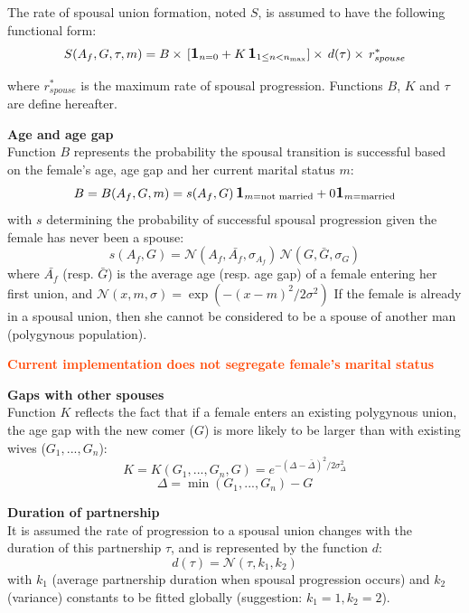 \documentclass[11pt, onecolumn]{article}
\newcommand{\one}[1]{\textbf{\large{1}}_{#1}}
\newcommand{\warning}[1]{\textbf{\textcolor{OrangeRed}{#1}}}
\begin{document}
The rate of spousal union formation, noted $S$, is assumed to have the following functional form:
\begin{equation}
\label{eqSpouse}
S(A_f,G,\tau,m) =B  \times\,  \left[\one{n=0} +  K\,\one{1\leq n <n_{\mathrm{max}}} \right] \times\, d(\tau) \times\,   r_{spouse}^* 
\end{equation}

where $ r_{spouse}^* $ is the maximum rate of spousal progression.
 Functions $B$, $K$ and $\tau$ are define hereafter.

\textbf{Age and age gap}\\
Function $B$ represents the probability the spousal transition is successful based on the female's age, age gap and her current marital status $m$:
$$B = B(A_f,G,m)= s(A_f,G)\,\one{m=\text{not married}} + 0\one{m=\text{married}}  $$
with $s$ determining the probability of successful spousal progression given the female has never been a spouse:
$$ s(A_f,G) = \mathcal{N}(A_f,\bar{A_f},\sigma_{A_f})\, \mathcal{N}(G,\bar{G},\sigma_{G}) $$
where $\bar{A_f}$ (resp. $\bar{G}$) is the average age (resp. age gap) of a female entering her first union,  and $\mathcal{N}(x,m,\sigma)=\exp(-(x-m)^2/2\sigma^2)$ 
If the female is already in a spousal union, then she cannot be considered to be a spouse of another man (polygynous population).

\warning{Current implementation does not segregate female's marital status}


\textbf{Gaps with other spouses}\\
Function $K$ reflects the fact that if a female enters an existing polygynous union, the age gap with the new comer ($G$) is more likely to be larger than with existing wives ($G_1,...,G_n$):
$$K = K(G_{1},...,G_{n},G) = e^{-(\Delta-\bar{\Delta})^2/2\sigma_\Delta^2}$$ 
$$\Delta = \min(G_1,...,G_n)-G$$

\textbf{Duration of partnership}\\
It is assumed the rate of progression to a spousal union changes with the duration of this partnership $\tau$, and is represented by the function $d$:
$$d(\tau) =  \mathcal{N}(\tau,k_1,k_2)$$
with $k_1$ (average partnership duration when spousal progression occurs) and $k_2$ (variance) constants to be fitted globally (suggestion: $k_1=1, k_2=2$).
\end{document}
